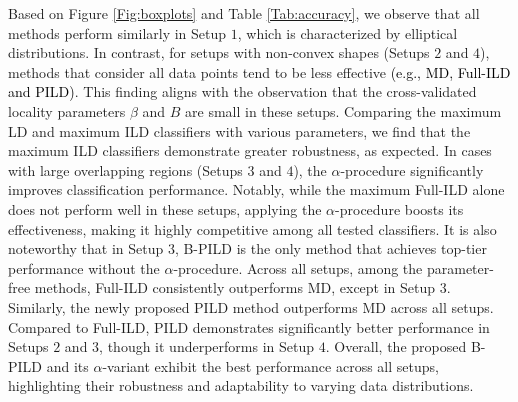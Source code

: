 \documentclass[final,3p,times]{elsarticle}
\begin{document}
Based on Figure \ref{Fig:boxplots} and Table \ref{Tab:accuracy}, we observe that all methods perform similarly in Setup $1$, which is characterized by elliptical distributions. In contrast, for setups with non-convex shapes (Setups $2$ and $4$), methods that consider all data points tend to be less effective \textcolor{black}{(e.g., MD, Full-ILD and PILD)}. This finding aligns with the observation that the cross-validated locality parameters $\beta$ and $B$ are small in these setups. Comparing the maximum LD and maximum ILD classifiers with various parameters, we find that the maximum ILD classifiers demonstrate greater robustness, as expected. In cases with large overlapping regions (Setups $3$ and $4$), the $\alpha$-procedure significantly improves classification performance. Notably, while the maximum Full-ILD alone does not perform well in these setups, applying the $\alpha$-procedure boosts its effectiveness, making it highly competitive among all tested classifiers. It is also noteworthy that in Setup $3$, B-PILD is the only method that achieves top-tier performance without the $\alpha$-procedure. Across all setups, among the parameter-free methods, Full-ILD consistently outperforms MD, except in Setup $3$. Similarly, the newly proposed PILD method outperforms MD across all setups. Compared to Full-ILD, PILD demonstrates significantly better performance in Setups $2$ and $3$, though it underperforms in Setup $4$. Overall, the proposed B-PILD and its $\alpha$-variant exhibit the best performance across all setups, highlighting their robustness and adaptability to varying data distributions.
\end{document}
